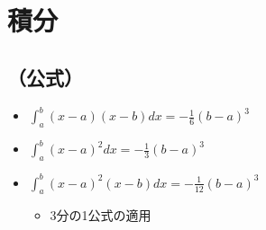 \documentclass[dvipdfmx,uplatex]{jsarticle}
\begin{document}
\section{積分}
\subsection{（公式）}
\begin{itemize}
	\item $ \int^b_a (x - a)(x - b)dx = - \frac{1}{6} (b - a)^3$
	\item $\int^b_a (x - a)^2dx = - \frac{1}{3} (b - a)^3$
	\item $\int^b_a (x - a)^2(x - b)dx = - \frac{1}{12} (b - a)^3$
	\begin{itemize}
		\item 3分の1公式の適用
	\end{itemize}
\end{itemize}
\end{document}
